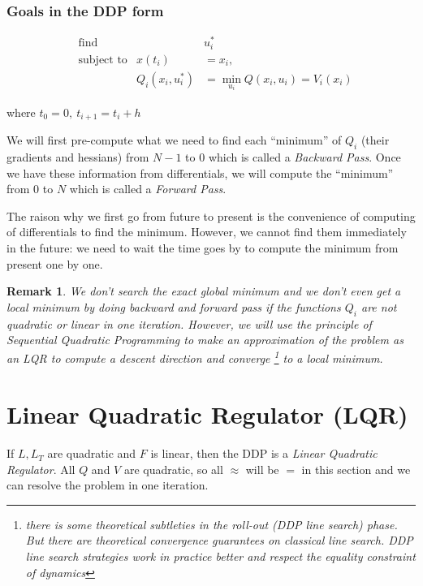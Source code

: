 \documentclass{report}
\newtheorem*{remark}{Remark}
\begin{document}
\subsubsection{Goals in the DDP form}

\begin{equation}
\begin{aligned}
&\text{find}             && u_i^* \\
&\text{subject to}       &x(t_i)      &= x_i,  \\
&							      &Q_i(x_i, u_i^*) &= \min_{u_i} Q(x_i, u_i) = V_i(x_i)
\end{aligned}
\end{equation}

where $t_0 = 0, \ t_{i+1} = t_i + h  $

We will first pre-compute what we need to find each ``minimum'' of $Q_i$ (their gradients and hessians) from $N-1$ to $0$ which is called a \emph{Backward Pass}. Once we have these information from differentials, we will compute the ``minimum'' from $0$ to $N$ which is called a \emph{Forward Pass}.

The raison why we first go from future to present is the convenience of computing of differentials to find the minimum. However, we cannot find them immediately in the future: we need to wait the time goes by to compute the minimum from present one by one.

\begin{remark}	
	We don't search the exact global minimum and we don't even get a local minimum by doing backward and forward pass if the functions $Q_i$ are not quadratic or linear in one iteration. However, we will use the principle of \emph{Sequential Quadratic Programming} to make an approximation of the problem as an LQR to compute a descent direction and converge \footnote{there is some theoretical subtleties in the roll-out (DDP line search) phase. But there are theoretical convergence guarantees on classical line search. DDP line search strategies work in practice better and respect the equality constraint of dynamics} to a local minimum.
\end{remark}
\section{Linear Quadratic Regulator (LQR)}
If $L, L_T$ are quadratic and $F$ is linear, then the DDP is a \emph{Linear Quadratic Regulator}. All $Q$ and $V$ are quadratic, so all $\approx$ will be $=$ in this section and we can resolve the problem in one iteration.
\end{document}
